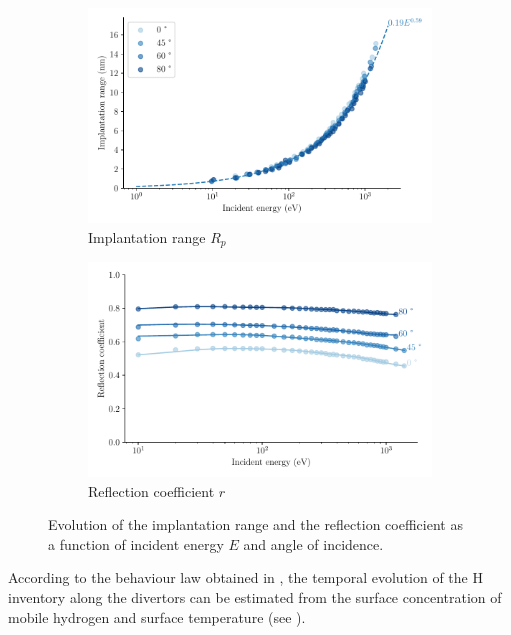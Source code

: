 \begin{figure}[h]
    \centering
    \begin{subfigure}{0.5\linewidth}
        \includegraphics[width=\linewidth]{Figures/Chapter4/implantation_range.pdf}
        \caption{Implantation range $R_p$}
    \end{subfigure}%
    \begin{subfigure}{0.5\linewidth}                          
        \includegraphics[width=\linewidth]{Figures/Chapter4/reflection_coeff.pdf}
        \caption{Reflection coefficient $r$}
    \end{subfigure}
    \caption{Evolution of the implantation range and the reflection coefficient as a function of incident energy $E$ and angle of incidence.}
\end{figure}

According to the behaviour law obtained in , the temporal evolution of the H inventory along the divertors can be estimated from the surface concentration of mobile hydrogen and surface temperature (see ).

